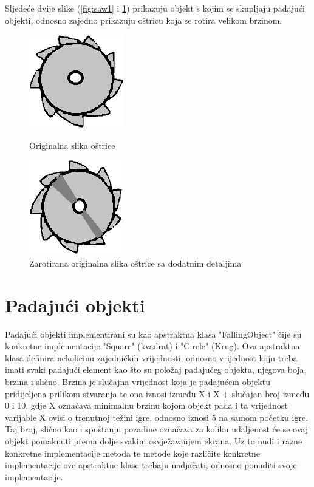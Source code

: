 \documentclass[times, utf8, zavrsni, numeric]{fer}
\begin{document}
	Sljedeće dvije slike (\ref{fig:saw1} i \ref{fig:saw2}) prikazuju objekt s kojim se skupljaju padajući objekti, odnosno zajedno prikazuju oštricu koja se rotira velikom brzinom.
	
		\begin{figure}[!htb]
			\begin{minipage}{0.48\textwidth}
				\centering
				\includegraphics[scale=0.6]{"slike/saw1.png"} 
				\caption{Originalna slika oštrice}
				\label{fig:saw1}
			\end{minipage}\hfill
			\begin{minipage}{0.48\textwidth}
				\centering
				\includegraphics[scale=0.6]{"slike/saw2.png"} 
				\caption{Zarotirana originalna slika oštrice sa dodatnim detaljima}
				\label{fig:saw2}
			\end{minipage}
		\end{figure}
	
	\section{Padajući objekti}
	Padajući objekti implementirani su kao apstraktna klasa "FallingObject" čije su konkretne implementacije "Square" (kvadrat) i "Circle" (Krug). Ova apstraktna klasa definira nekolicinu zajedničkih vrijednosti, 
	odnosno vrijednost koju treba imati svaki padajući element kao što su položaj padajućeg objekta, njegova boja, brzina i slično.
	Brzina je slučajna vrijednost koja je padajućem objektu pridijeljena prilikom stvaranja te ona iznosi između X i X + slučajan broj između 0 i 10, gdje X označava minimalnu brzinu kojom objekt pada i ta vrijednost
	varijable X ovisi o trenutnoj težini igre, odnosno iznosi 5 na samom početku igre. Taj broj, slično kao i spuštanju pozadine označava za koliku udaljenost će se ovaj objekt pomaknuti prema dolje svakim osvježavanjem ekrana.
	Uz to nudi i razne konkretne implementacije metoda te metode koje različite konkretne implementacije ove apstraktne klase trebaju nadjačati, odnosno ponuditi svoje implementacije. 
	
\end{document}
